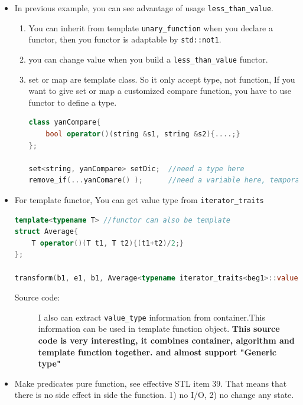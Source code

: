 \documentclass[a4paper,11pt,twoside]{book}
\begin{document}
\begin{itemize}
   \item In previous example, you can see advantage of usage \texttt{less\_than\_value}.
   \begin{enumerate}
   \item You can inherit from  template \texttt{unary\_function} when you declare a functor, then you functor is adaptable by \texttt{std::not1}.

   \item you can change value when you build a \texttt{less\_than\_value} functor.

   \item set or map are template class. So it only accept type, not function, If you want to give set or map a customized compare function,  you have to use functor to define a type.
\begin{lstlisting}[frame=single, language=c++]
class yanCompare{
    bool operator()(string &s1, string &s2){....;}
};

set<string, yanCompare> setDic;  //need a type here
remove_if(...yanComare() );      //need a variable here, temporary is OK
\end{lstlisting}
 
\end{enumerate}

	\item For template functor, You can get value type from \texttt{iterator\_traits}
\begin{lstlisting}[frame=single, language=c++]
template<typename T> //functor can also be template 
struct Average{
	T operator()(T t1, T t2){(t1+t2)/2;}
};

transform(b1, e1, b1, Average<typename iterator_traits<beg1>::value_type>());	
\end{lstlisting}
\begin{description}
	\item[Source code:] I also can extract \texttt{value\_type} information from container.This information can be used in template function object. \textbf{This source code is very interesting, it combines container, algorithm and template function together. and almost support "Generic type"}
\end{description}

	\item Make predicates pure function, see effective STL item 39. That means that there is no side effect in side the function. 1) no I/O, 2) no change any state.



\end{itemize}
\end{document}
